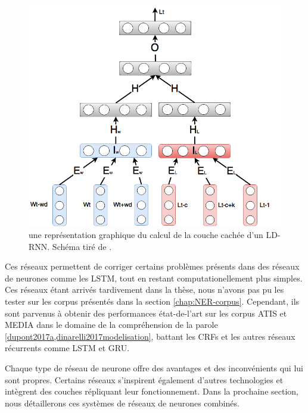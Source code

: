 \documentclass[citation\_needed]{subfiles}
\begin{document}
\begin{figure}[ht!]
    \centering
    \includegraphics[scale=0.3]{images/NN/LD-RNN/DeepLDRNN_2}
    \caption{une représentation graphique du calcul de la couche cachée d'un LD-RNN. Schéma tiré de \citet{dupont2017a}.}
    \label{fig:ht-computation}
\end{figure}

Ces réseaux permettent de corriger certains problèmes présents dans des réseaux de neurones comme les LSTM, tout en restant computationellement plus simples. Ces réseaux étant arrivés tardivement dans la thèse, nous n'avons pas pu les tester sur les corpus présentés dans la section \ref{chap:NER-corpus}. Cependant, ils sont parvenus à obtenir des performances état-de-l'art sur les corpus ATIS et MEDIA dans le domaine de la compréhension de la parole \ref{dupont2017a,dinarelli2017modelisation}, battant les CRFs et les autres réseaux récurrents comme LSTM et GRU.

Chaque type de réseau de neurone offre des avantages et des inconvénients qui lui sont propres. Certains réseaux s'inspirent également d'autres technologies et intègrent des couches répliquant leur fonctionnement. Dans la prochaine section, nous détaillerons ces systèmes de réseaux de neurones combinés.
\end{document}
